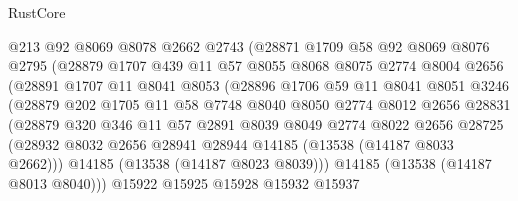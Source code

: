 \begin{lexlean}{RustCore}
\begin{coremodule}
                    @213
                    @92
                    @8069
                    @8078
                    @2662
                    @2743
                    (@28871
                      @1709
                      @58
                      @92
                      @8069
                      @8076
                      @2795
                      (@28879
                        @1707
                        @439
                        @11
                        @57
                        @8055
                        @8068
                        @8075
                        @2774
                        @8004
                        @2656
                        (@28891
                          @1707
                          @11
                          @8041
                          @8053
                          (@28896
                            @1706
                            @59
                            @11
                            @8041
                            @8051
                            @3246
                            (@28879
                              @202
                              @1705
                              @11
                              @58
                              @7748
                              @8040
                              @8050
                              @2774
                              @8012
                              @2656
                              @28831
                              (@28879
                                @320
                                @346
                                @11
                                @57
                                @2891
                                @8039
                                @8049
                                @2774
                                @8022
                                @2656
                                @28725
                                (@28932
                                  @8032
                                  @2656
                                  @28941
                                  @28944
                                  @14185
                                  (@13538 (@14187 @8033 @2662)))
                                @14185
                                (@13538 (@14187 @8023 @8039)))
                              @14185
                              (@13538 (@14187 @8013 @8040)))
                            @15922
                            @15925
                            @15928
                            @15932
                            @15937

\end{coremodule}
\end{lexlean}
